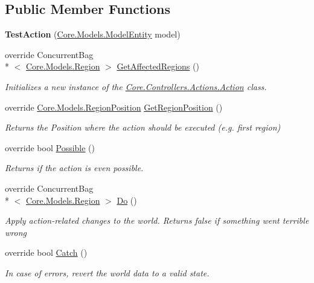 \subsection*{Public Member Functions}
\begin{DoxyCompactItemize}
\item 
\hypertarget{classCore_1_1Controllers_1_1Actions_1_1TestAction_acde41768970ae5575ff02cbe5892759b}{{\bfseries Test\-Action} (\hyperlink{classCore_1_1Models_1_1ModelEntity}{Core.\-Models.\-Model\-Entity} model)}\label{classCore_1_1Controllers_1_1Actions_1_1TestAction_acde41768970ae5575ff02cbe5892759b}

\item 
override Concurrent\-Bag\\*
$<$ \hyperlink{classCore_1_1Models_1_1Region}{Core.\-Models.\-Region} $>$ \hyperlink{classCore_1_1Controllers_1_1Actions_1_1TestAction_a67ca0915de8d842e7ddaaada1ca4efa6}{Get\-Affected\-Regions} ()
\begin{DoxyCompactList}\small\item\em Initializes a new instance of the \hyperlink{classCore_1_1Controllers_1_1Actions_1_1Action}{Core.\-Controllers.\-Actions.\-Action} class. \end{DoxyCompactList}\item 
override \hyperlink{classCore_1_1Models_1_1RegionPosition}{Core.\-Models.\-Region\-Position} \hyperlink{classCore_1_1Controllers_1_1Actions_1_1TestAction_a054601a2ec2a06e9b28367b9f77788f2}{Get\-Region\-Position} ()
\begin{DoxyCompactList}\small\item\em Returns the Position where the action should be executed (e.\-g. first region) \end{DoxyCompactList}\item 
override bool \hyperlink{classCore_1_1Controllers_1_1Actions_1_1TestAction_a34c402de500bea49dcf438efb421517d}{Possible} ()
\begin{DoxyCompactList}\small\item\em Returns if the action is even possible. \end{DoxyCompactList}\item 
override Concurrent\-Bag\\*
$<$ \hyperlink{classCore_1_1Models_1_1Region}{Core.\-Models.\-Region} $>$ \hyperlink{classCore_1_1Controllers_1_1Actions_1_1TestAction_a5d7f62d1d383e7b31ea51dd078a2139d}{Do} ()
\begin{DoxyCompactList}\small\item\em Apply action-\/related changes to the world. Returns false if something went terrible wrong \end{DoxyCompactList}\item 
override bool \hyperlink{classCore_1_1Controllers_1_1Actions_1_1TestAction_a5335698d7fc5aabc08748af1ffe18fcc}{Catch} ()
\begin{DoxyCompactList}\small\item\em In case of errors, revert the world data to a valid state. \end{DoxyCompactList}\end{DoxyCompactItemize}
